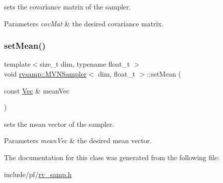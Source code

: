 sets the covariance matrix of the sampler. 


\begin{DoxyParams}{Parameters}
{\em cov\+Mat} & the desired covariance matrix. \\
\hline
\end{DoxyParams}
\mbox{\label{classrvsamp_1_1MVNSampler_a99b3bae7eb823d0bfcbbccf89555569e}} 
\subsubsection{\texorpdfstring{set\+Mean()}{setMean()}}
{\footnotesize\ttfamily template$<$size\+\_\+t dim, typename float\+\_\+t $>$ \\
void \hyperlink{classrvsamp_1_1MVNSampler}{rvsamp\+::\+M\+V\+N\+Sampler}$<$ dim, float\+\_\+t $>$\+::set\+Mean (\begin{DoxyParamCaption}\item[{const \hyperlink{classrvsamp_1_1MVNSampler_a1110bc1695c5c959914602dbaf2f6878}{Vec} \&}]{mean\+Vec }\end{DoxyParamCaption})}



sets the mean vector of the sampler. 


\begin{DoxyParams}{Parameters}
{\em mean\+Vec} & the desired mean vector. \\
\hline
\end{DoxyParams}


The documentation for this class was generated from the following file\+:\begin{DoxyCompactItemize}
\item 
include/pf/\hyperlink{rv__samp_8h}{rv\+\_\+samp.\+h}\end{DoxyCompactItemize}
